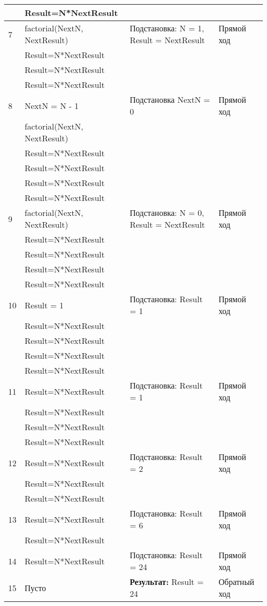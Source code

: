 {\begin{longtable}{|p{1.15cm}|p{4cm}|p{6cm}|p{6cm}|}
      & Result=N*NextResult & & \\
    \hline
    7 & factorial(NextN, NextResult) & Подстановка: N = 1, Result = NextResult & Прямой ход \\
      & Result=N*NextResult & & \\
      & Result=N*NextResult & & \\
      & Result=N*NextResult & & \\
    \hline
    8 & NextN = N - 1 & Подстановка NextN = 0 & Прямой ход \\
      & factorial(NextN, NextResult) & & \\
      & Result=N*NextResult & & \\
      & Result=N*NextResult & & \\
      & Result=N*NextResult & & \\
      & Result=N*NextResult & & \\
    \hline
    9 & factorial(NextN, NextResult) & Подстановка: N = 0, Result = NextResult & Прямой ход \\
      & Result=N*NextResult & & \\
      & Result=N*NextResult & & \\
      & Result=N*NextResult & & \\
      & Result=N*NextResult & & \\
    \hline
    10 & Result = 1 & Подстановка: Result = 1 & Прямой ход \\
       & Result=N*NextResult & & \\
       & Result=N*NextResult & & \\
       & Result=N*NextResult & & \\
       & Result=N*NextResult & & \\
    \hline
    11 & Result=N*NextResult & Подстановка: Result = 1 & Прямой ход \\
       & Result=N*NextResult & & \\
       & Result=N*NextResult & & \\
       & Result=N*NextResult & & \\
    \hline
    12 & Result=N*NextResult & Подстановка: Result = 2 & Прямой ход \\
       & Result=N*NextResult & & \\
       & Result=N*NextResult & & \\
    \hline
    13 & Result=N*NextResult & Подстановка: Result = 6 & Прямой ход \\
       & Result=N*NextResult & & \\
    \hline
    14 & Result=N*NextResult & Подстановка: Result = 24 & Прямой ход \\
    \hline
    15 & Пусто & \textbf{Результат:} Result = 24 & Обратный ход \\
    \hline
\end{longtable}
}

